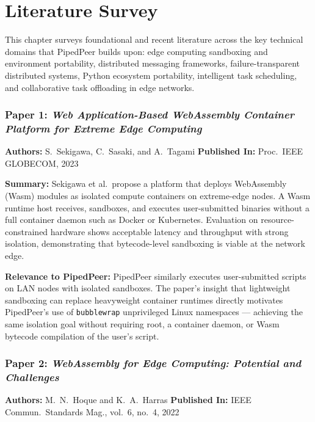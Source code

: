 \chapter{Literature Survey}

This chapter surveys foundational and recent literature across the key technical
domains that PipedPeer builds upon: edge computing sandboxing and environment
portability, distributed messaging frameworks, failure-transparent distributed
systems, Python ecosystem portability, intelligent task scheduling, and
collaborative task offloading in edge networks.

\subsection*{Paper 1: \textit{Web Application-Based WebAssembly Container Platform
for Extreme Edge Computing}}
\textbf{Authors:} S.~Sekigawa, C.~Sasaki, and A.~Tagami \quad
\textbf{Published In:} Proc.\ IEEE GLOBECOM, 2023~\cite{sekigawa2023}

\noindent\textbf{Summary:}
Sekigawa et al.\ propose a platform that deploys WebAssembly (Wasm) modules as
isolated compute containers on extreme-edge nodes. A Wasm runtime host receives,
sandboxes, and executes user-submitted binaries without a full container daemon
such as Docker or Kubernetes. Evaluation on resource-constrained hardware shows
acceptable latency and throughput with strong isolation, demonstrating that
bytecode-level sandboxing is viable at the network edge.

\noindent\textbf{Relevance to PipedPeer:}
PipedPeer similarly executes user-submitted scripts on LAN nodes with isolated
sandboxes. The paper's insight that lightweight sandboxing can replace heavyweight
container runtimes directly motivates PipedPeer's use of \texttt{bubblewrap}
unprivileged Linux namespaces — achieving the same isolation goal without
requiring root, a container daemon, or Wasm bytecode compilation of the user's
script.

\subsection*{Paper 2: \textit{WebAssembly for Edge Computing: Potential and
Challenges}}
\textbf{Authors:} M.~N.~Hoque and K.~A.~Harras \quad
\textbf{Published In:} IEEE Commun.\ Standards Mag., vol.~6, no.~4, 2022~\cite{hoque2022}

